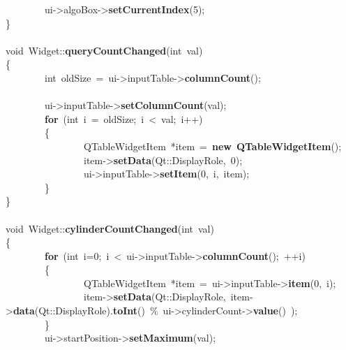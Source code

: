 \mbox{}\ \ \ \ \ \ \ \ ui-\textgreater{}algoBox-\textgreater{}\textbf{setCurrentIndex}(5); \\
\mbox{}\} \\
\mbox{} \\
\mbox{}void\ Widget::\textbf{queryCountChanged}(int\ val) \\
\mbox{}\{ \\
\mbox{}\ \ \ \ \ \ \ \ int\ oldSize\ =\ ui-\textgreater{}inputTable-\textgreater{}\textbf{columnCount}(); \\
\mbox{} \\
\mbox{}\ \ \ \ \ \ \ \ ui-\textgreater{}inputTable-\textgreater{}\textbf{setColumnCount}(val); \\
\mbox{}\ \ \ \ \ \ \ \ \textbf{for}\ (int\ i\ =\ oldSize;\ i\ \textless{}\ val;\ i++) \\
\mbox{}\ \ \ \ \ \ \ \ \{ \\
\mbox{}\ \ \ \ \ \ \ \ \ \ \ \ \ \ \ \ QTableWidgetItem\ *item\ =\ \textbf{new}\ \textbf{QTableWidgetItem}(); \\
\mbox{}\ \ \ \ \ \ \ \ \ \ \ \ \ \ \ \ item-\textgreater{}\textbf{setData}(Qt::DisplayRole,\ 0); \\
\mbox{}\ \ \ \ \ \ \ \ \ \ \ \ \ \ \ \ ui-\textgreater{}inputTable-\textgreater{}\textbf{setItem}(0,\ i,\ item); \\
\mbox{}\ \ \ \ \ \ \ \ \} \\
\mbox{}\} \\
\mbox{} \\
\mbox{}void\ Widget::\textbf{cylinderCountChanged}(int\ val) \\
\mbox{}\{ \\
\mbox{}\ \ \ \ \ \ \ \ \textbf{for}\ (int\ i=0;\ i\ \textless{}\ ui-\textgreater{}inputTable-\textgreater{}\textbf{columnCount}();\ ++i) \\
\mbox{}\ \ \ \ \ \ \ \ \{ \\
\mbox{}\ \ \ \ \ \ \ \ \ \ \ \ \ \ \ \ QTableWidgetItem\ *item\ =\ ui-\textgreater{}inputTable-\textgreater{}\textbf{item}(0,\ i); \\
\mbox{}\ \ \ \ \ \ \ \ \ \ \ \ \ \ \ \ item-\textgreater{}\textbf{setData}(Qt::DisplayRole,\ item-\textgreater{}\textbf{data}(Qt::DisplayRole).\textbf{toInt}()\ \%\ ui-\textgreater{}cylinderCount-\textgreater{}\textbf{value}()\ ); \\
\mbox{}\ \ \ \ \ \ \ \ \} \\
\mbox{}\ \ \ \ \ \ \ \ ui-\textgreater{}startPosition-\textgreater{}\textbf{setMaximum}(val); \\
